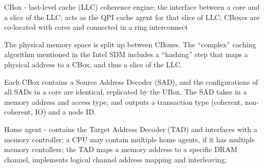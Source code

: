 CBox - last-level cache (LLC) coherence engine; the interface between a core
and a slice of the LLC; acts as the QPI cache agent for that slice of LLC;
CBoxes are co-located with cores and connected in a ring interconnect

The physical memory space is split up between CBoxes. The ``complex'' caching
algorithm mentioned in the Intel SDM includes a ``hashing'' step that maps a
physical address to a CBox, and thus a slice of the LLC.

Each CBox contains a Source Address Decoder (SAD), and the configurations of
all SADs in a core are identical, replicated by the UBox. The SAD takes in a
memory address and access type, and outputs a transaction type (coherent,
non-coherent, IO) and a node ID.

Home agent - contains the Target Address Decoder (TAD) and interfaces with a
memory controller; a CPU may contain multiple home agents, if it has multiple
memory contollers; the TAD maps a memory address to a specific DRAM channel,
implements logical channel address mapping and interleaving;



